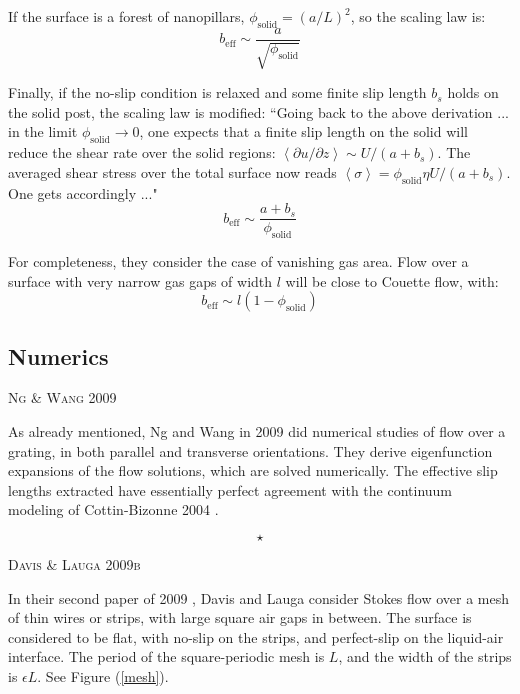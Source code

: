 \documentclass[12pt, a4paper, twoside, openright]{book}
\newcommand{\beff}{\ensuremath{b_{\mathrm{eff}}}}
\newcommand{\phisol}{\ensuremath{\phi_{\mathrm{solid}}}}
\newcommand{\sep}{\begin{equation*} \star \end{equation*}}
\newcommand{\paper}[1]
         {\colorbox[gray]{0.8}{ \textsc{#1}}
         
         }
\begin{document}
\vspace{1em}

If the surface is a forest of nanopillars, $\phisol = (a/L)^2$, so the scaling law is:
\begin{equation}
\beff \sim  \frac{a}{\sqrt{ \phisol}} 
\end{equation}

\vspace{1em}
Finally, if the no-slip condition is relaxed and some finite slip length $b_s$ holds on the solid post, the scaling law is modified:
``Going back to the above derivation ... in the limit $\phisol \to 0$, one expects that a finite slip length on the solid will reduce the shear rate over the solid regions: $ \left< \partial u / \partial z \right> \sim U/(a+b_s)  $. The averaged shear stress over the total surface now reads $\left< \sigma \right> = \phisol \eta U / ( a + b_s)$. One gets accordingly ..."
\begin{equation}
\beff \sim  \frac{a + b_s}{\phisol} 
\end{equation}

\vspace{1em}
For completeness, they consider the case of vanishing gas area.  Flow over a surface with very narrow gas gaps of width $l$ will be close to Couette flow, with:
\begin{equation}
\beff \sim l (1-\phisol) 
\end{equation}



\clearpage
\subsection{Numerics}

\paper{Ng \& Wang 2009}
As already mentioned, Ng and Wang in 2009 \cite{NgWang2009} did numerical studies of flow over a grating, in both parallel and transverse orientations. They derive eigenfunction expansions of the flow solutions, which are solved numerically.  The effective slip lengths extracted have essentially perfect agreement with the continuum modeling of Cottin-Bizonne 2004 \cite{Cottin-Bizonne2004}.

\sep

\paper{Davis \& Lauga 2009b}
In their second paper of 2009 \cite{DavisLauga2009b}, Davis and Lauga consider Stokes flow over a mesh of thin wires or strips, with large square air gaps in between.  The surface is considered to be flat, with no-slip on the strips, and perfect-slip on the liquid-air interface.  The period of the square-periodic mesh is $L$, and the width of the strips is $\epsilon L$.  See Figure (\ref{mesh}).
\end{document}
